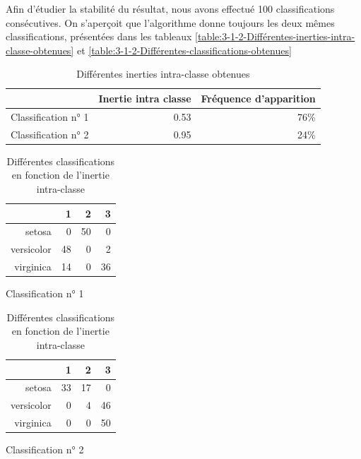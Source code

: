 \documentclass[a4paper,10pt]{report}
\begin{document}
Afin d'étudier la stabilité du résultat, nous avons effectué 100 classifications consécutives. On s'aperçoit que l'algorithme donne toujours les deux mêmes classifications, présentées dans les tableaux \autoref{table:3-1-2-Différentes-inerties-intra-classe-obtenues} et \autoref{table:3-1-2-Différentes-classifications-obtenues}

\begin{table}[H]
	\centering
	\captionsetup{justification=centering, margin=3cm}
	\begin{tabular}{r|r|r}
		& Inertie intra classe & Fréquence d'apparition \\ 
		\hline
		Classification n° 1 & 0.53 &  76\% \\ 
		Classification n° 2 & 0.95 &  24\% \\ 
	\end{tabular}
	\caption{\small Différentes inerties intra-classe obtenues}
	\label{table:3-1-2-Différentes-inerties-intra-classe-obtenues}
\end{table}


\begin{table}[H]
	\centering
	\captionsetup{justification=centering, margin=3cm}
	\begin{subtable}{.3\textwidth}
		\centering
		\begin{tabular}{r|rrr}
			& 1 & 2 & 3 \\ 
			\hline
			setosa &   0 &  50 &   0 \\ 
			versicolor &  48 &   0 &   2 \\ 
			virginica &  14 &   0 &  36 \\ 
		\end{tabular}
		\caption{\small Classification n° 1}
	\end{subtable}
	\begin{subtable}{.3\textwidth}
		\centering
		\begin{tabular}{r|rrr}
			& 1 & 2 & 3 \\ 
			\hline
			setosa &  33 &  17 &   0 \\ 
			versicolor &   0 &   4 &  46 \\ 
			virginica &   0 &   0 &  50 \\ 
		\end{tabular}
		\caption{\small Classification n° 2}
	\end{subtable}
	\caption{\small Différentes classifications en fonction de l'inertie intra-classe}
	\label{table:3-1-2-Différentes-classifications-obtenues}
\end{table}
\end{document}
